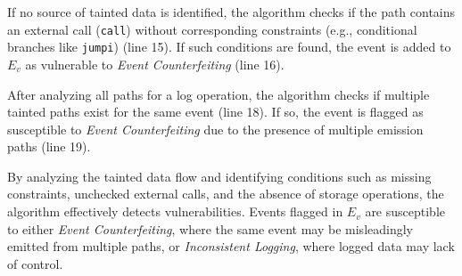 If no source of tainted data is identified, the algorithm checks if the path contains an external call (\texttt{call}) without corresponding constraints (e.g., conditional branches like \texttt{jumpi}) (line 15). If such conditions are found, the event is added to \(E_v\) as vulnerable to \emph{Event Counterfeiting} (line 16).

After analyzing all paths for a log operation, the algorithm checks if multiple tainted paths exist for the same event (line 18). If so, the event is flagged as susceptible to \emph{Event Counterfeiting} due to the presence of multiple emission paths (line 19).

By analyzing the tainted data flow and identifying conditions such as missing constraints, unchecked external calls, and the absence of storage operations, the algorithm effectively detects vulnerabilities. Events flagged in \(E_v\) are susceptible to either \emph{Event Counterfeiting}, where the same event may be misleadingly emitted from multiple paths, or \emph{Inconsistent Logging}, where logged data may lack of control.






